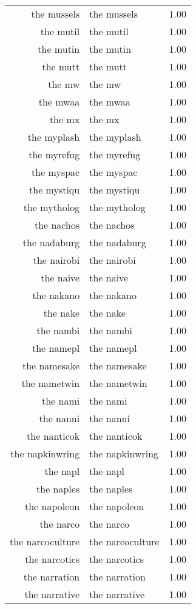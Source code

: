 \begin{table}[ht]
\begin{tabular}{rlr}
  the mussels & the mussels & 1.00 \\ 
  the mutil & the mutil & 1.00 \\ 
  the mutin & the mutin & 1.00 \\ 
  the mutt & the mutt & 1.00 \\ 
  the mw & the mw & 1.00 \\ 
  the mwaa & the mwaa & 1.00 \\ 
  the mx & the mx & 1.00 \\ 
  the myplash & the myplash & 1.00 \\ 
  the myrefug & the myrefug & 1.00 \\ 
  the myspac & the myspac & 1.00 \\ 
  the mystiqu & the mystiqu & 1.00 \\ 
  the mytholog & the mytholog & 1.00 \\ 
  the nachos & the nachos & 1.00 \\ 
  the nadaburg & the nadaburg & 1.00 \\ 
  the nairobi & the nairobi & 1.00 \\ 
  the naive & the naive & 1.00 \\ 
  the nakano & the nakano & 1.00 \\ 
  the nake & the nake & 1.00 \\ 
  the nambi & the nambi & 1.00 \\ 
  the namepl & the namepl & 1.00 \\ 
  the namesake & the namesake & 1.00 \\ 
  the nametwin & the nametwin & 1.00 \\ 
  the nami & the nami & 1.00 \\ 
  the nanni & the nanni & 1.00 \\ 
  the nanticok & the nanticok & 1.00 \\ 
  the napkinwring & the napkinwring & 1.00 \\ 
  the napl & the napl & 1.00 \\ 
  the naples & the naples & 1.00 \\ 
  the napoleon & the napoleon & 1.00 \\ 
  the narco & the narco & 1.00 \\ 
  the narcoculture & the narcoculture & 1.00 \\ 
  the narcotics & the narcotics & 1.00 \\ 
  the narration & the narration & 1.00 \\ 
  the narrative & the narrative & 1.00 \\ 

\end{tabular}
\end{table}
